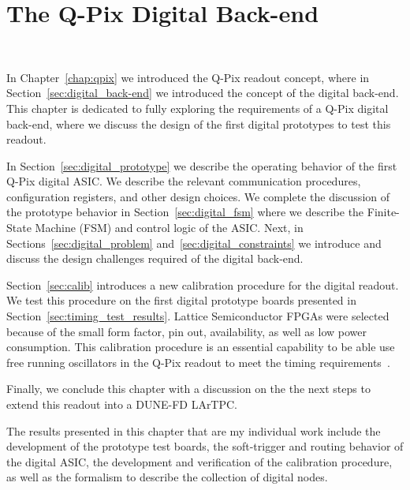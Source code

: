 \chapter{The Q-Pix Digital Back-end}~\label{chap:qdb}

In Chapter~\ref{chap:qpix} we introduced the Q-Pix readout concept, where in Section~\ref{sec:digital_back-end} we introduced the concept of the digital back-end.
This chapter is dedicated to fully exploring the requirements of a Q-Pix digital back-end, where we discuss the design of the first digital prototypes to test this readout.

In Section~\ref{sec:digital_prototype} we describe the operating behavior of the first Q-Pix digital ASIC.
We describe the relevant communication procedures, configuration registers, and other design choices.
We complete the discussion of the prototype behavior in Section~\ref{sec:digital_fsm} where we describe the Finite-State Machine (FSM) and control logic of the ASIC.
Next, in Sections~\ref{sec:digital_problem} and~\ref{sec:digital_constraints} we introduce and discuss the design challenges required of the digital back-end.

Section~\ref{sec:calib} introduces a new calibration procedure for the digital readout.
We test this procedure on the first digital prototype boards presented in Section~\ref{sec:timing_test_results}.
Lattice Semiconductor FPGAs \citep{lattice_ice40up_datasheet} were selected because of the small form factor, pin out, availability, as well as low power consumption.
This calibration procedure is an essential capability to be able use free running oscillators in the Q-Pix readout to meet the timing requirements~\citep{qpix:nygren:mei}.

Finally, we conclude this chapter with a discussion on the the next steps to extend this readout into a DUNE-FD LArTPC.

The results presented in this chapter that are my individual work include the development of the prototype test boards, the soft-trigger and routing behavior of the digital ASIC, the development and verification of the calibration procedure, as well as the formalism to describe the collection of digital nodes.



